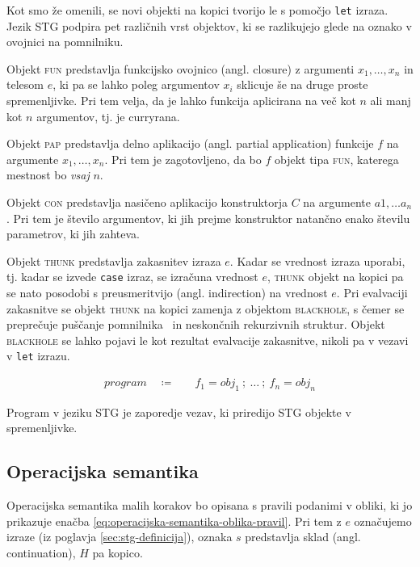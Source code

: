 Kot smo že omenili, se novi objekti na kopici tvorijo le s pomočjo \texttt{let} izraza. Jezik STG podpira pet različnih vrst objektov, ki se razlikujejo glede na oznako v ovojnici na pomnilniku.

Objekt \textsc{fun} predstavlja funkcijsko ovojnico (angl. closure) z argumenti $x_1, \dots, x_n$ in telesom $e$, ki pa se lahko poleg argumentov $x_i$ sklicuje še na druge proste spremenljivke. Pri tem velja, da je lahko funkcija aplicirana na več kot $n$ ali manj kot $n$ argumentov, tj. je curryrana.

Objekt \textsc{pap} predstavlja delno aplikacijo (angl. partial application) funkcije $f$ na argumente $x_1, \dots, x_n$. Pri tem je zagotovljeno, da bo $f$ objekt tipa \textsc{fun}, katerega mestnost bo \textit{vsaj} $n$.

Objekt \textsc{con} predstavlja nasičeno aplikacijo konstruktorja $C$ na argumente $a1, \dots a_n$. Pri tem je število argumentov, ki jih prejme konstruktor natančno enako številu parametrov, ki jih zahteva.

Objekt \textsc{thunk} predstavlja zakasnitev izraza $e$. Kadar se vrednost izraza uporabi, tj. kadar se izvede \texttt{case} izraz, se izračuna vrednost $e$, \textsc{thunk} objekt na kopici pa se nato posodobi s preusmeritvijo (angl. indirection) na vrednost $e$. Pri evalvaciji zakasnitve se objekt \textsc{thunk} na kopici zamenja z objektom \textsc{blackhole}, s čemer se preprečuje puščanje pomnilnika~\cite{jones1992tail} in neskončnih rekurzivnih struktur. Objekt \textsc{blackhole} se lahko pojavi le kot rezultat evalvacije zakasnitve, nikoli pa v vezavi v \texttt{let} izrazu.

\begin{align*}
	program \quad \coloneq& \quad f_1 = obj_1 \: ; \: \dots \: ; \: f_n = obj_n
\end{align*}

Program v jeziku STG je zaporedje vezav, ki priredijo STG objekte v spremenljivke.

\subsection{Operacijska semantika}

Operacijska semantika malih korakov bo opisana s pravili podanimi v obliki, ki jo prikazuje enačba \ref{eq:operacijska-semantika-oblika-pravil}. Pri tem z $e$ označujemo izraze (iz poglavja \ref{sec:stg-definicija}), oznaka $s$ predstavlja sklad  (angl. continuation), $H$ pa kopico.

